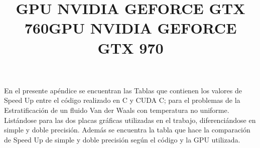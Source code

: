 \chapter{}
\label{ap_VdW}

En el presente apéndice se encuentran las Tablas que contienen los valores de Speed Up entre el código realizado en C y CUDA C; para el problemas de la Estratificación de un fluido Van der Waals con temperatura no uniforme.
Listándose para las dos placas gráficas utilizadas en el trabajo, diferenciándose en simple y doble precisión.
Además se encuentra la tabla que hace la comparación de Speed Up de simple y doble precisión según el código y la GPU utilizada.\\
\\
\title{\textbf{GPU NVIDIA GEFORCE GTX 760}}
\label{apend_VdW_760}









\newpage

\title{\textbf{GPU NVIDIA GEFORCE GTX 970}}
\label{apend_VdW_970}











